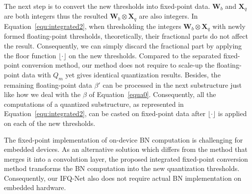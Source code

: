 \documentclass[10pt,twocolumn,letterpaper]{article}
\begin{document}
The next step is to convert the new thresholds into fixed-point data. $\textbf{W}_b$ and $\textbf{X}_q$ are both integers thus the resulted $\textbf{W}_b\otimes \textbf{X}_q$ are also integers. In Equation~\ref{equ:integrated2}, when thresholding the integers $\textbf{W}_b\otimes \textbf{X}_q$ with newly formed floating-point thresholds, theoretically, their fractional parts do not affect the result. Consequently, we can simply discard the fractional part by applying the floor function $\lfloor\cdot\rfloor$ on the new thresholds. Compared to the separated fixed-point conversion method, our method does not require to scale-up the floating-point data with $Q_m$ yet gives identical quantization results. Besides, the remaining floating-point data $\beta{'}$ can be processed in the next substructure just like how we deal with the $\beta$ of Equation~\ref{equa0}. Consequently, all the computations of a quantized substructure, as represented in Equation~\ref{equ:integrated2}, can be casted on fixed-point data after $\lfloor\cdot\rfloor$ is applied on each of the new thresholds.

The fixed-point implementation of on-device BN computation is challenging for embedded devices. As an alternative solution which differs from the method that merges it into a convolution layer, the proposed integrated fixed-point conversion method transforms the BN computation into the new quantization thresholds. Consequently, our IFQ-Net also does not require actual BN implementation on embedded hardware.
\end{document}
